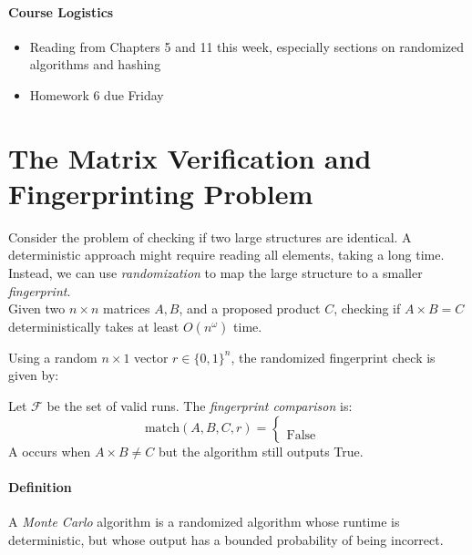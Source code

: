 \documentclass[11pt]{exam}
\begin{document}
	
	
	\paragraph{Course Logistics}
	\begin{itemize}
		\item Reading from Chapters 5 and 11 this week, especially sections on randomized algorithms and hashing
		\item Homework 6 due Friday
	\end{itemize}
	
	\section{The Matrix Verification and Fingerprinting Problem}
	Consider the problem of checking if two large structures are identical. A deterministic approach might require reading all elements, taking a long time. 
    Instead, we can use \emph{randomization} to map the large structure to a smaller \emph{fingerprint}.\\
	
	Given two $n \times n$ matrices $A, B$, and a proposed product $C$, checking if $A \times B = C$ deterministically takes at least $O(n^\omega)$ time.
	
	\vs{2.5cm}
	
	
	Using a random $n \times 1$ vector $r \in \{0,1\}^n$, the randomized fingerprint check is given by: 
\vs{3cm}
	
	Let $\mathcal{F}$ be the set of valid runs. The \emph{fingerprint comparison} is:
	\begin{equation*}
		\text{match}(A, B, C, r) = \begin{cases}
		 \\  \\%
			\text{False} & %
		\end{cases}
	\end{equation*}
	A  occurs when $A \times B \neq C$ but the algorithm still outputs True. \\
	
	\paragraph{Definition} A \emph{Monte Carlo} algorithm is a randomized algorithm whose runtime is deterministic, but whose output has a bounded probability of being incorrect.
	
\end{document}
